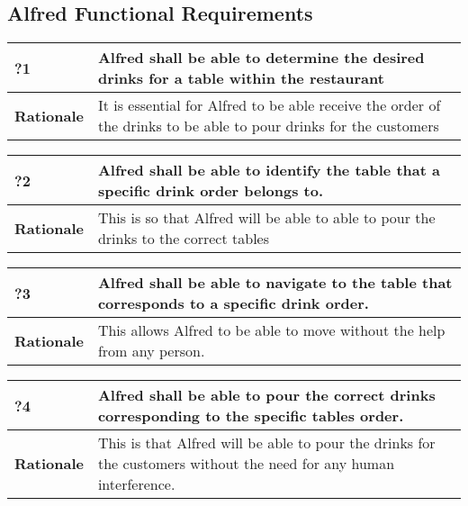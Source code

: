 \documentclass [11pt]{article}
\begin{document}


\subsection{Alfred Functional Requirements}

\begin{longtable}{| p{ } | p{ } | }\hline 
\rowcolor{tableCell}\textbf{?1} & Alfred shall be able to determine the desired drinks for a table within the restaurant \\ \hline
\textbf{Rationale} & It is essential for Alfred to be able receive the order of the drinks to be able to pour drinks for the customers\\ \hline 
\end{longtable}

\begin{longtable}{| p{ } | p{ } | }\hline 
\rowcolor{tableCell}\textbf{?2} & Alfred shall be able to identify the table that a specific drink order belongs to.\\ \hline
\textbf{Rationale} &  This is so that Alfred will be able to able to pour the drinks to the correct tables\\ \hline 

\end{longtable}

\begin{longtable}{| p{ } | p{ } | }\hline 
\rowcolor{tableCell}\textbf{?3} &  Alfred shall be able to navigate to the table that corresponds to a specific drink order. \\ \hline
\textbf{Rationale} & This allows Alfred to be able to move without the help from any person. \\ \hline 
\end{longtable}

\begin{longtable}{| p{ } | p{ } | }\hline 
\rowcolor{tableCell}\textbf{?4} & Alfred shall be able to pour the correct drinks corresponding to the specific tables order.\\ \hline
\textbf{Rationale} &  This is that Alfred will be able to pour the drinks for the customers without the need for any human interference. \\ \hline 
\end{longtable}
\end{document}
